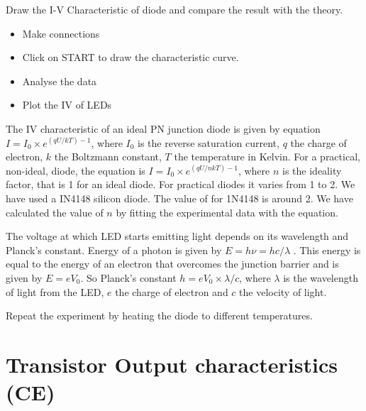 \documentclass[a4paper,12pt,english]{sphinxmanual}
\let\sphinxpxdimen\pdfpxdimen\else\newdimen\sphinxpxdimen
\begin{document}
Draw the I-V Characteristic of diode and compare the result with the
theory.


\noindent\sphinxincludegraphics[width=300\sphinxpxdimen]{{diode_iv}.pdf}
\noindent\sphinxincludegraphics[width=300\sphinxpxdimen]{{diode-iv-screen}.pdf}
\begin{itemize}
\item {} 
Make connections

\item {} 
Click on START to draw the characteristic curve.

\item {} 
Analyse the data

\item {} 
Plot the IV of LEDs

\end{itemize}


The IV characteristic of an ideal PN junction diode is given by equation
\(I = I_0 \times e^{(qU/kT) - 1}\), where \(I_0\) is the reverse saturation
current, \(q\) the charge of electron, \(k\) the Boltzmann constant, \(T\) the
temperature in Kelvin. For a practical, non-ideal, diode, the equation
is \(I = I_0 \times e^{(qU/nkT) - 1}\), where \(n\) is the ideality factor, that
is 1 for an ideal diode. For practical diodes it varies from 1 to 2. We
have used a IN4148 silicon diode. The value of  for 1N4148 is around 2.
We have calculated the value of \(n\) by fitting the experimental data with
the equation.

The voltage at which LED starts emitting light depends on its wavelength
and Planck’s constant. Energy of a photon is given by \(E = h\nu  = hc/\lambda\) .
This energy is equal to the energy of an electron that overcomes the
junction barrier and is given by \(E = eV_0\). So Planck’s constant
\(h = eV_0 \times \lambda / c\), where \(\lambda\) is the wavelength of light from the LED, \(e\)
the charge of electron and \(c\) the velocity of light.

Repeat the experiment by heating the diode to different temperatures.


\section{Transistor Output characteristics (CE)}
\label{\detokenize{3.14:transistor-output-characteristics-ce}}\label{\detokenize{3.14::doc}}
\end{document}
